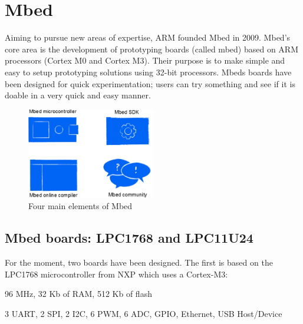 \documentclass[pdftex,10pt,a4paper]{report}
\newenvironment{packed_item}{
\begin{itemize}
  \setlength{\itemsep}{1pt}
  \setlength{\parskip}{0pt}
  \setlength{\parsep}{0pt}
}{\end{itemize}}
\begin{document}
\newpage

\section{Mbed}
Aiming to pursue new areas of expertise, ARM founded Mbed in 2009. Mbed's core area is the development of prototyping boards (called mbed) based on ARM processors (Cortex M0 and Cortex M3). Their purpose is to make simple and easy to setup prototyping solutions using 32-bit processors. Mbeds boards have been designed for quick experimentation; users can try something and see if it is doable in a very quick and easy manner.

\begin{figure}[h!]
\centering
\includegraphics[width=0.5\textwidth]{./mbed_4elements.jpg}
\caption{Four main elements of Mbed}
\label{Four main elements of Mbed}
\end{figure}

\subsection{Mbed boards: LPC1768 and LPC11U24}
For the moment, two boards have been designed. The first is based on the LPC1768 microcontroller from NXP which uses a Cortex-M3:
\begin{packed_item}
	\item 96 MHz, 32 Kb of RAM, 512 Kb of flash
	\item 3 UART, 2 SPI, 2 I2C, 6 PWM, 6 ADC, GPIO, Ethernet, USB Host/Device
\end{packed_item}
\end{document}
